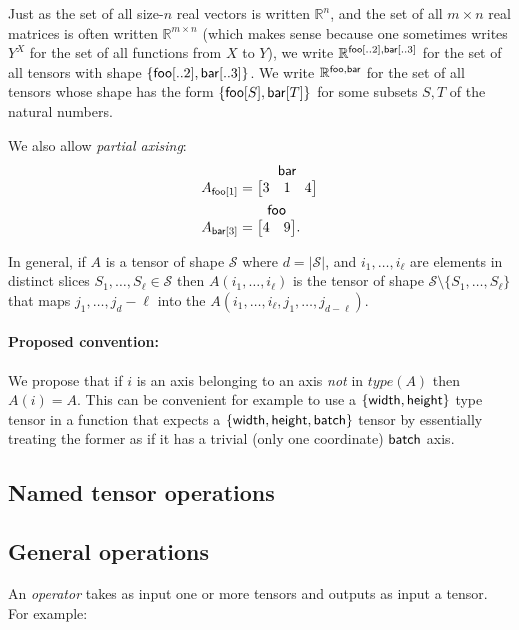 \documentclass{article}
\makeatletter
\newcommand{\tuple}[1]{\{#1\}}
\newcommand{\nmatrix}[3]{\name{#1}\begin{array}[b]{@{}c@{}}\name{#2}\\\begin{bmatrix}#3\end{bmatrix}\end{array}}
\makeatother
\begin{document}
Just as the set of all size-$n$ real vectors is written $\mathbb{R}^n$, and the set of all $m\times n$ real matrices is often written $\mathbb{R}^{m \times n}$ (which makes sense because one sometimes writes $Y^X$ for the set of all functions from $X$ to $Y$), we write $\mathbb{R}^{\mathsf{foo}[..2], \mathsf{bar}[..3]}$ for the set of all tensors with shape $\tuple{\nset{foo}{..2}, \nset{bar}{..3}}$.
We write $\mathbb{R}^{\mathsf{foo},\mathsf{bar}}$ for the set of all tensors whose shape has the form $\{ \mathsf{foo}[S], \mathsf{bar}[T] \}$ for some subsets $S,T$ of the natural numbers.


We also allow \emph{partial axising}:
\begin{align*}
A_{\nidx{foo}{1}} &= \nmatrix{}{bar}{
  3 & 1 & 4
}
\\
A_{\nidx{bar}{3}} &= \nmatrix{}{foo}{
  4 & 9
}.
\end{align*}

In general, if $A$ is a tensor of shape $\mathcal{S}$ where $d=|\mathcal{S}|$, and $i_1,\ldots,i_\ell$ are elements in distinct slices $S_1,\ldots,S_\ell \in \mathcal{S}$ then $A(i_1,\ldots,i_\ell)$ is the tensor of shape $\mathcal{S} \setminus \{ S_1,\ldots, S_\ell \}$ that maps $j_1,\ldots,j_d-{\ell}$ into the $A(i_1,\ldots,i_\ell,j_1,\ldots,j_{d-\ell})$.



\paragraph{Proposed convention:} We propose that if $i$ is an axis belonging to an axis  \emph{not} in  $type(A)$ then $A(i)=A$.  This can be convenient for example to use a $\{ \mathsf{width} ,\mathsf{height} \}$ type tensor in a function that expects a $\{ \mathsf{width} , \mathsf{height} , \mathsf{batch} \}$ tensor by essentially treating the former as if it has a trivial (only one coordinate) $\mathsf{batch}$ axis.


\subsection{Named tensor operations}
\label{sec:operations}

\subsection{General operations}

An \emph{operator}  takes as input one or more tensors and outputs as input a tensor. For example:
\end{document}

